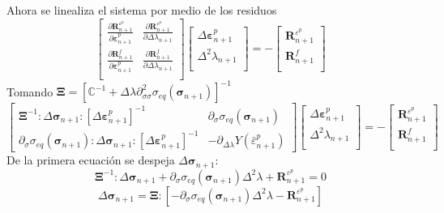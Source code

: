 \documentclass[12pt]{article}
\begin{document}
Ahora se linealiza el sistema por medio de los residuos
\[\renewcommand\arraystretch{1.6}
    \begin{bmatrix}
        \frac{\partial\pmb{R}_{n+1}^{\varepsilon^p}}{\partial \pmb{\varepsilon}^p_{n+1}} & \frac{\partial\pmb{R}_{n+1}^{\varepsilon^p}}{\partial \Delta\lambda_{n+1}} \\ 
        \frac{\partial\pmb{R}_{n+1}^{f}}{\partial \pmb{\varepsilon}^p_{n+1}} & \frac{\partial\pmb{R}_{n+1}^{f}}{\partial \Delta\lambda_{n+1}} \\
    \end{bmatrix}
    \begin{bmatrix}
        \Delta\pmb{\varepsilon}^p_{n+1} \\
        \Delta^2\lambda_{n+1} \\
    \end{bmatrix} = -
    \begin{bmatrix}
        \pmb{R}_{n+1}^{\varepsilon^p} \\
        \pmb{R}_{n+1}^{f} \\
    \end{bmatrix} 
\]
Tomando $\pmb{\Xi} = \left[\mathbb{C}^{-1} + \Delta\lambda\partial^2_{\sigma\sigma}\sigma_{eq}\left(\pmb{\sigma}_{n+1}\right)\right]^{-1}$ 
\[\renewcommand\arraystretch{1.6}
    \begin{bmatrix}
        \pmb{\Xi}^{-1}:\Delta\pmb{\sigma}_{n+1}:\left[\Delta\pmb{\varepsilon}^p_{n+1}\right]^{-1} & \partial_{\sigma}\sigma_{eq}\left(\pmb{\sigma}_{n+1}\right) \\ 
        \partial_{\sigma}\sigma_{eq}\left(\pmb{\sigma}_{n+1}\right):\Delta\pmb{\sigma}_{n+1}:\left[\Delta\pmb{\varepsilon}^p_{n+1}\right]^{-1} & -\partial_{\Delta\lambda}Y\left(\bar\varepsilon^p_{n+1}\right)
    \end{bmatrix}
    \begin{bmatrix}
        \Delta\pmb{\varepsilon}^p_{n+1} \\
        \Delta^2\lambda_{n+1} \\
    \end{bmatrix} = -
    \begin{bmatrix}
        \pmb{R}_{n+1}^{\varepsilon^p} \\
        \pmb{R}_{n+1}^{f} \\
    \end{bmatrix}
\]
De la primera ecuación se despeja $\Delta\pmb{\sigma}_{n+1}$:
\[ \pmb{\Xi}^{-1}:\Delta\pmb{\sigma}_{n+1} + \partial_{\sigma}\sigma_{eq}\left(\pmb{\sigma}_{n+1}\right)\Delta^2\lambda + \pmb{R}_{n+1}^{\varepsilon^p} = 0\]
\[ \Delta\pmb{\sigma}_{n+1} = \pmb{\Xi}:\left[-\partial_{\sigma}\sigma_{eq}\left(\pmb{\sigma}_{n+1}\right)\Delta^2\lambda - \pmb{R}_{n+1}^{\varepsilon^p} \right]\]
\end{document}
